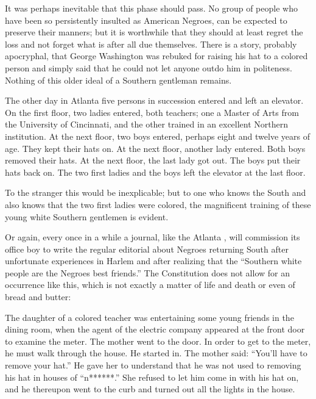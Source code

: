 \documentclass[letterpaper,10pt,english]{jupyterBook}
\begin{document}
\sphinxAtStartPar
It was perhaps inevitable that this phase should pass. No group of people who have been so persistently insulted as American Negroes, can be expected to preserve their manners; but it is worthwhile that they should at least regret the loss and not forget what is after all due themselves. There is a story, probably apocryphal, that George Washington was rebuked for raising his hat to a colored person and simply said that he could not let anyone outdo him in politeness. Nothing of this older ideal of a Southern gentleman remains.

\sphinxAtStartPar
The other day in Atlanta five persons in succession entered and left an elevator. On the first floor, two ladies entered, both teachers; one a Master of Arts from the University of Cincinnati, and the other trained in an excellent Northern institution. At the next floor, two boys entered, perhaps eight and twelve years of age. They kept their hats on. At the next floor, another lady entered. Both boys removed their hats. At the next floor, the last lady got out. The boys put their hats back on. The two first ladies and the boys left the elevator at the last floor.

\sphinxAtStartPar
To the stranger this would be inexplicable; but to one who knows the South and also knows that the two first ladies were colored, the magnificent training of these young white Southern gentlemen is evident.

\sphinxAtStartPar
Or again, every once in a while a journal, like the Atlanta , will commission its office boy to write the regular editorial about Negroes returning South after unfortunate experiences in Harlem and after realizing that the “Southern white people are the Negroes best friends.” The Constitution does not allow for an occurrence like this, which is not exactly a matter of life and death or even of bread and butter:

\sphinxAtStartPar
The daughter of a colored teacher was entertaining some young friends in the dining room, when the agent of the electric company appeared at the front door to examine the meter. The mother went to the door. In order to get to the meter, he must walk through the house. He started in. The mother said: “You’ll have to remove your hat.” He gave her to understand that he was not used to removing his hat in houses of “n******.” She refused to let him come in with his hat on, and he thereupon went to the curb and turned out all the lights in the house.
\end{document}
